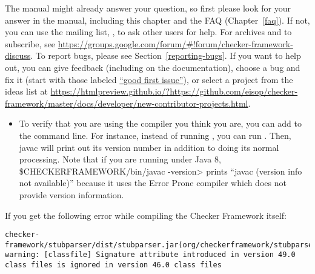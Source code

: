 \htmlhr
{}

\begin{sloppypar}
The manual might already answer your question, so first please look for
your answer in the manual,
including this chapter and the FAQ (Chapter~\ref{faq}).
If not, you can use the mailing list,
, to ask other users for
help.  For archives and to subscribe, see \url{https://groups.google.com/forum/#!forum/checker-framework-discuss}.
To report bugs, please see Section~\ref{reporting-bugs}.
If you want to help out, you can give feedback (including on the
documentation), choose a bug and fix it (start with those labeled
\href{https://github.com/eisop/checker-framework/issues?q=is\%3Aissue+is\%3Aopen+label\%3A\%22good+first+issue%22}{``good
first
issue''}),
or select a
project from the ideas list at
\url{https://htmlpreview.github.io/?https://github.com/eisop/checker-framework/master/docs/developer/new-contributor-projects.html}.
\end{sloppypar}



\begin{itemize}
\item
To verify that you are using the compiler you think you are, you can add
 to the command line.  For instance, instead of running
, you can run .  Then, javac will print out its version number in addition
to doing its normal processing.  Note that if you are running under Java 8,
\<\$CHECKERFRAMEWORK/bin/javac -version> prints ``javac (version info
not available)'' because it uses the Error Prone compiler which does not
provide version information.

\end{itemize}



If you get the following error while compiling the Checker Framework itself:

\begin{smaller}
\begin{Verbatim}
checker-framework/stubparser/dist/stubparser.jar(org/checkerframework/stubparser/ast/CompilationUnit.class):
warning: [classfile] Signature attribute introduced in version 49.0 class files is ignored in version 46.0 class files
\end{Verbatim}
\end{smaller}

